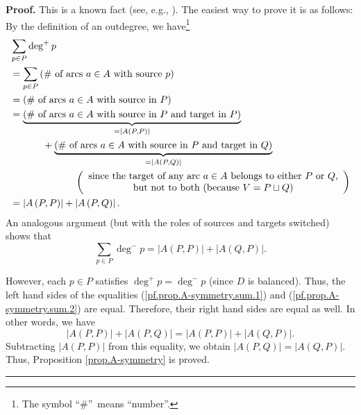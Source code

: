 \documentclass[numbers=enddot,12pt,final,onecolumn,notitlepage]{scrartcl}%
\theoremstyle{definition}
\newenvironment{proof}[1][Proof]{\noindent\textbf{#1.} }{\ \rule{0.5em}{0.5em}}
\let\sumnonlimits\sum
\renewcommand{\sum}{\sumnonlimits\limits}
\theoremstyle{plainsl}
\begin{document}
\begin{proof}
This is a known fact (see, e.g., \cite[Exercise 9.1]{22s}). The easiest way to
prove it is as follows: By the definition of an outdegree, we
have\footnote{The symbol \textquotedblleft\#\textquotedblright\ means
\textquotedblleft number\textquotedblright.}%
\begin{align}
&  \sum_{p\in P}\deg^{+}p\nonumber\\
&  =\sum_{p\in P}\left(  \text{\# of arcs }a\in A\text{ with source }p\right)
\nonumber\\
&  =\left(  \text{\# of arcs }a\in A\text{ with source in }P\right)
\nonumber\\
&  =\underbrace{\left(  \text{\# of arcs }a\in A\text{ with source in }P\text{
and target in }P\right)  }_{=\left\vert A\left(  P,P\right)  \right\vert
}\nonumber\\
&  \ \ \ \ \ \ \ \ \ \ +\underbrace{\left(  \text{\# of arcs }a\in A\text{
with source in }P\text{ and target in }Q\right)  }_{=\left\vert A\left(
P,Q\right)  \right\vert }\nonumber\\
&  \ \ \ \ \ \ \ \ \ \ \ \ \ \ \ \ \ \ \ \ \left(
\begin{array}
[c]{c}%
\text{since the target of any arc }a\in A\text{ belongs to either }P\text{ or
}Q\text{,}\\
\text{but not to both (because }V=P\sqcup Q\text{)}%
\end{array}
\right) \nonumber\\
&  =\left\vert A\left(  P,P\right)  \right\vert +\left\vert A\left(
P,Q\right)  \right\vert . \label{pf.prop.A-symmetry.sum.1}%
\end{align}
An analogous argument (but with the roles of sources and targets switched)
shows that%
\begin{equation}
\sum_{p\in P}\deg^{-}p=\left\vert A\left(  P,P\right)  \right\vert +\left\vert
A\left(  Q,P\right)  \right\vert . \label{pf.prop.A-symmetry.sum.2}%
\end{equation}


However, each $p\in P$ satisfies $\deg^{+}p=\deg^{-}p$ (since $D$ is
balanced). Thus, the left hand sides of the equalities
(\ref{pf.prop.A-symmetry.sum.1}) and (\ref{pf.prop.A-symmetry.sum.2}) are
equal. Therefore, their right hand sides are equal as well. In other words, we
have%
\[
\left\vert A\left(  P,P\right)  \right\vert +\left\vert A\left(  P,Q\right)
\right\vert =\left\vert A\left(  P,P\right)  \right\vert +\left\vert A\left(
Q,P\right)  \right\vert .
\]
Subtracting $\left\vert A\left(  P,P\right)  \right\vert $ from this equality,
we obtain $\left\vert A\left(  P,Q\right)  \right\vert =\left\vert A\left(
Q,P\right)  \right\vert $. Thus, Proposition \ref{prop.A-symmetry} is proved.
\end{proof}
\end{document}
